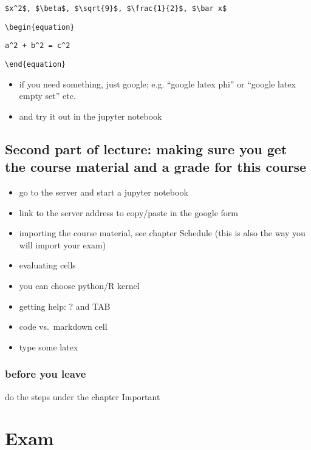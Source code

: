 \documentclass[]{book}
\providecommand{\tightlist}{%
  \setlength{\itemsep}{0pt}\setlength{\parskip}{0pt}}
\begin{document}
\texttt{\$x\^{}2\$,\ \$\textbackslash{}beta\$,\ \$\textbackslash{}sqrt\{9\}\$,\ \$\textbackslash{}frac\{1\}\{2\}\$,\ \$\textbackslash{}bar\ x\$}

\texttt{\textbackslash{}begin\{equation\}}

\texttt{a\^{}2\ +\ b\^{}2\ =\ c\^{}2}

\texttt{\textbackslash{}end\{equation\}}

\begin{itemize}
\tightlist
\item
  if you need something, just google; e.g. ``google latex phi'' or
  ``google latex empty set'' etc.
\item
  and try it out in the jupyter notebook
\end{itemize}

\section{Second part of lecture: making sure you get the course material
and a grade for this
course}\label{second-part-of-lecture-making-sure-you-get-the-course-material-and-a-grade-for-this-course}

\begin{itemize}
\tightlist
\item
  go to the server and start a jupyter notebook
\item
  link to the server address to copy/paste in the google form
\item
  importing the course material, see chapter Schedule (this is also the
  way you will import your exam)
\item
  evaluating cells
\item
  you can choose python/R kernel
\item
  getting help: ? and TAB
\item
  code vs.~markdown cell
\item
  type some latex
\end{itemize}

\subsection{before you leave}\label{before-you-leave}

do the steps under the chapter Important

\chapter{Exam}\label{exam-1}
\end{document}
